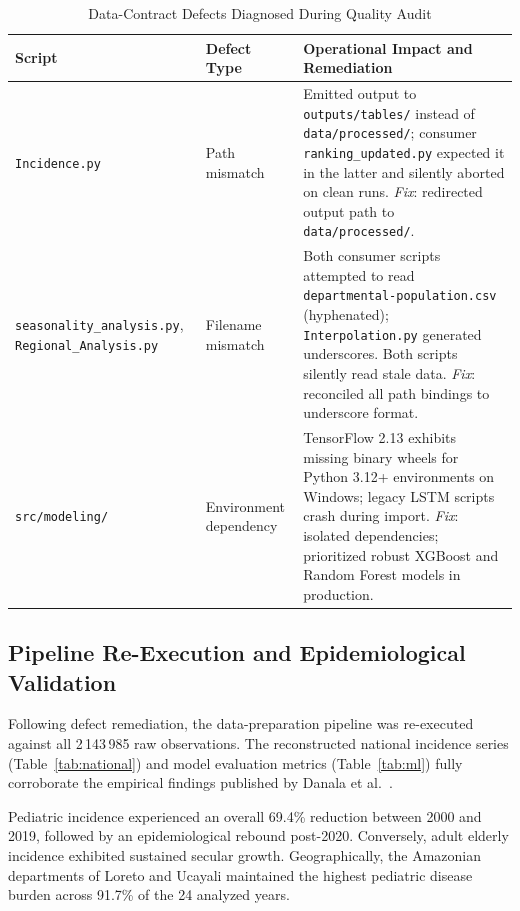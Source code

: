\documentclass[conference]{IEEEtran}
\begin{document}
\begin{table}[!t]
\caption{Data-Contract Defects Diagnosed During Quality Audit}
\label{tab:defects}
\centering
\footnotesize
\begin{tabularx}{\columnwidth}{@{}p{2.3cm}p{1.4cm}X@{}}
\toprule
\textbf{Script} & \textbf{Defect Type} & \textbf{Operational Impact and Remediation} \\
\midrule
\texttt{Incidence.py} & Path mismatch & 
Emitted output to \texttt{outputs/tables/} instead of \texttt{data/processed/}; consumer \texttt{ranking\_updated.py} expected it in the latter and silently aborted on clean runs.\newline
\textit{Fix}: redirected output path to \texttt{data/processed/}. \\
\addlinespace
\texttt{seasonality\_}\allowbreak\texttt{analysis.py},\newline
\texttt{Regional\_}\allowbreak\texttt{Analysis.py} & Filename mismatch & 
Both consumer scripts attempted to read \texttt{departmental-population.csv} (hyphenated); \texttt{Interpolation.py} generated underscores. Both scripts silently read stale data.\newline
\textit{Fix}: reconciled all path bindings to underscore format. \\
\addlinespace
\texttt{src/modeling/} & Environment dependency & 
TensorFlow 2.13 exhibits missing binary wheels for Python 3.12+ environments on Windows; legacy LSTM scripts crash during import.\newline
\textit{Fix}: isolated dependencies; prioritized robust XGBoost and Random Forest models in production. \\
\bottomrule
\end{tabularx}
\end{table}

\subsection{Pipeline Re-Execution and Epidemiological Validation}

Following defect remediation, the data-preparation pipeline was re-executed against all 2\,143\,985 raw observations. The reconstructed national incidence series (Table~\ref{tab:national}) and model evaluation metrics (Table~\ref{tab:ml}) fully corroborate the empirical findings published by Danala et al.~\cite{Danala2024}.

Pediatric incidence experienced an overall 69.4\% reduction between 2000 and 2019, followed by an epidemiological rebound post-2020. Conversely, adult elderly incidence exhibited sustained secular growth. Geographically, the Amazonian departments of Loreto and Ucayali maintained the highest pediatric disease burden across 91.7\% of the 24 analyzed years.
\end{document}
